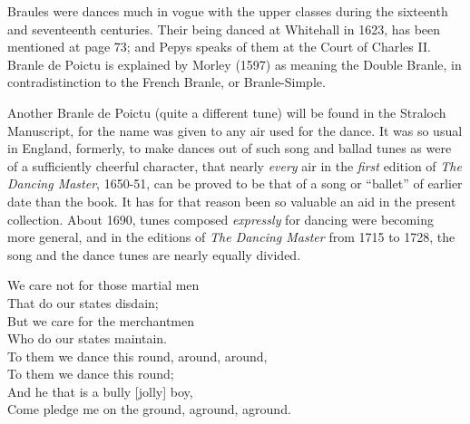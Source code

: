 Braules were dances much in vogue with the upper classes during the sixteenth
and seventeenth centuries. Their being danced at Whitehall in 1623, has
been mentioned at page 73; and Pepys speaks of them at the Court of Charles II.
Branle de Poictu is explained by Morley (1597) as meaning the Double Branle,
in contradistinction to the French Branle, or Branle-Simple.

Another Branle de Poictu (quite a different tune) will be found in the Straloch
Manuscript, for the name was given to \pagebreak any air used for the dance. It was so
usual in England, formerly, to make dances out of such song and ballad tunes as
were of a sufficiently cheerful character, that nearly \textit{every} air in the \textit{first} edition
of \textit{The Dancing Master}, 1650-51, can be proved to be that of a song or “ballet”
of earlier date than the book. It has for that reason been so valuable an aid in
the present collection. About 1690, tunes composed \textit{expressly} for dancing were
becoming more general, and in the editions of \textit{The Dancing Master} from 1715
to 1728, the song and the dance tunes are nearly equally divided.


\settowidth{\versewidth}{\vin Come pledge me on the ground, aground, aground.}
\begin{scverse}\begin{altverse}
We care not for those martial men\\
That do our states disdain;\\
But we care for the merchantmen\\
Who do our states maintain.\\
To them we dance this round, around, around,\\
To them we dance this round;\\
And he that is a bully [jolly] boy,\\
Come pledge me on the ground, aground, aground.
\end{altverse}
\end{scverse}
\pagebreak


